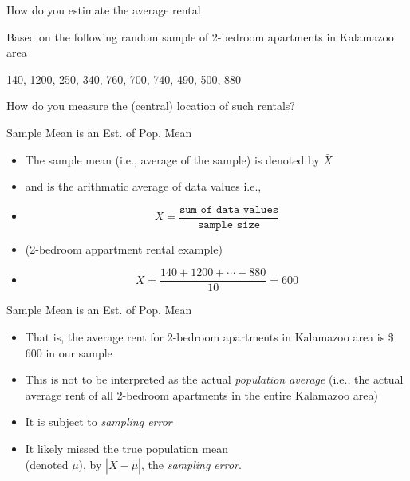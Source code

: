 \documentclass[14pt]{beamer}\usepackage[]{graphicx}\usepackage[]{color}
\begin{document}
\begin{frame}[fragile]{How do you estimate the average rental}

Based on the following random sample of 2-bedroom apartments in Kalamazoo area

\vspace{3mm}



  140, 1200, 250, 340, 760, 700, 740, 490, 500, 880
  
\vspace{3mm}

  How do you measure the (central) location of such rentals?

\end{frame}

\begin{frame}[fragile]{Sample Mean is an Est. of Pop. Mean}

\begin{itemize}
\item<1-> The sample mean (i.e., average of the sample) is denoted by $\bar{X}$
\item<2-> and is the arithmatic average of data values  i.e.,
\item<3->
\begin{equation*}
\bar{X} = \frac{\texttt{sum of data values}}{\texttt{sample size}}
\end{equation*}
\item<4-> (2-bedroom appartment rental example)
\item<5->
\begin{equation*}
\bar{X} = \frac{140 + 1200 + \cdots + 880}{10} = 600
\end{equation*}
\end{itemize}

\end{frame}
 
\begin{frame}[fragile]{Sample Mean is an Est. of Pop. Mean}

\begin{itemize}
\item<1-> That is, the average rent for 2-bedroom apartments in  Kalamazoo area is \$ 600 in our sample
\item<2-> This is not to be interpreted as the actual \textit{population average}  (i.e., the actual average rent of all 2-bedroom apartments in  the entire Kalamazoo area)
\item<3-> It is subject to \textit{sampling error}
\item<4-> It likely missed the true population mean \\ (denoted $\mu$), by $| \bar{X} - \mu |$,  the \textit{sampling error}.
\end{itemize}

\end{frame}
\end{document}

